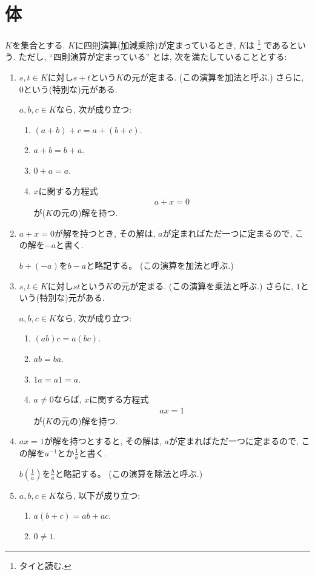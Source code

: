 \section{体}
$K$を集合とする.
$K$に四則演算(加減乗除)が定まっているとき,
$K$は
\footnote{タイと読む.}
であるという.
ただし,
``四則演算が定まっている''
とは, 次を満たしていることとする:
\begin{enumerate}
\item
  $s,t\in K$に対し$s+t$という$K$の元が定まる.
  (この演算を加法と呼ぶ.)
  さらに, $0$という(特別な)元がある.

  $a,b,c\in K$なら, 次が成り立つ:
  \begin{enumerate}
  \item
    $(a+b)+c=a+(b+c)$.
  \item
    $a+b=b+a$.
  \item
    $0+a=a$.
  \item
    $x$に関する方程式
    \begin{align*}
      a+x=0
    \end{align*}
    が($K$の元の)解を持つ.
  \end{enumerate}
\item
  $a+x=0$が解を持つとき,
  その解は,
  $a$が定まればただ一つに定まるので,
  この解を$-a$と書く.

  $b+(-a)$を$b-a$と略記する。
  (この演算を加法と呼ぶ.)

\item
  $s,t\in K$に対し$st$という$K$の元が定まる.
  (この演算を乗法と呼ぶ.)
  さらに, $1$という(特別な)元がある.

  $a,b,c\in K$なら, 次が成り立つ:
  \begin{enumerate}
  \item
    $(ab)c=a(bc)$.
  \item
  \label{def:field:item:comring}
    $ab=ba$.
  \item
    $1a=a1=a$.
  \item
  \label{def:field:item:invertible}
    $a\neq 0$ならば,
    $x$に関する方程式
    \begin{align*}
      ax=1
    \end{align*}
    が($K$の元の)解を持つ.
  \end{enumerate}

\item
  $ax=1$が解を持つとすると,
  その解は,
  $a$が定まればただ一つに定まるので,
  この解を$a^{-1}$とか$\frac{1}{a}$と書く.

  $b(\frac{1}{a})$を$\frac{b}{a}$と略記する。
  (この演算を除法と呼ぶ.)

\item
  $a,b,c\in K$なら, 以下が成り立つ:
  \begin{enumerate}
  \item $a(b+c)=ab+ac$.
  \item $0\neq 1$.
  \end{enumerate}
\end{enumerate}

